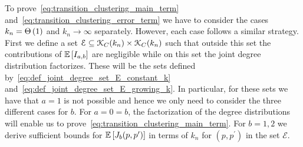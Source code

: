 To prove~\eqref{eq:transition_clustering_main_term} and~\eqref{eq:transition_clustering_error_term} we have to consider the cases $k_n = \Theta\left(1\right)$ and $k_n \to \infty$ separately. However, each case follows a similar strategy. First we define a set $\mathcal{E} \subseteq {\mathcal K}_{C}(k_n) \times {\mathcal K}_{C}(k_n)$ such that outside this set the contributions of $\mathbb{E}\left[I_{a,b}\right]$ are negligible while on this set the joint degree distribution factorizes. These will be the sets defined by~\eqref{eq:def_joint_degree_set_E_constant_k} and~\eqref{eq:def_joint_degree_set_E_growing_k}. In particular, for these sets we have that $a = 1$ is not possible and hence we only need to consider the three different cases for $b$. For $a =0 = b$, the factorization of the degree distributions will enable us to prove~\eqref{eq:transition_clustering_main_term}. For $b = 1, 2$ we derive sufficient bounds for $\mathbb{E}\left[J_b(p,p^\prime)\right]$ in terms of $k_n$ for $(p,p^\prime)$ in the set $\mathcal{E}$.




